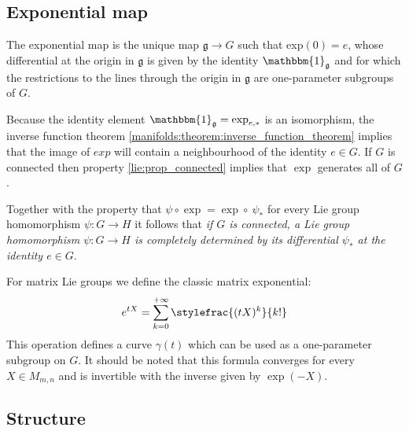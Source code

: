 \subsection{Exponential map}
	
	\begin{property}
		The exponential map is the unique map $\mathfrak{g}\rightarrow G$ such that exp$(0) = e$, whose differential at the origin in $\mathfrak{g}$ is given by the identity $\mathbbm{1}_\mathfrak{g}$ and for which the restrictions to the lines through the origin in $\mathfrak{g}$ are one-parameter subgroups of $G$.
	\end{property}
	\begin{result}
		Because the identity element $\mathbbm{1}_\mathfrak{g} = \exp_{e,\ast}$ is an isomorphism, the inverse function theorem \ref{manifolds:theorem:inverse_function_theorem} implies that the image of $exp$ will contain a neighbourhood of the identity $e\in G$. If $G$ is connected then property \ref{lie:prop_connected} implies that $\exp$ generates all of $G$.
		
		Together with the property that $\psi\circ\exp = \exp\circ\ \psi_\ast$ for every Lie group homomorphism $\psi:G\rightarrow H$ it follows that \textit{if $G$ is connected, a Lie group homomorphism $\psi:G\rightarrow H$ is completely determined by its differential $\psi_\ast$ at the identity $e\in G$}.
	\end{result}
	
	\begin{example}
		For matrix Lie groups we define the classic matrix exponential:
		\begin{equation}
			e^{tX} = \sum_{k=0}^{+\infty}\stylefrac{(tX)^k}{k!}
		\end{equation}
		This operation defines a curve $\gamma(t)$ which can be used as a one-parameter subgroup on $G$. It should be noted that this formula converges for every $X\in M_{m,n}$ and is invertible with the inverse given by $\exp(-X)$.
	\end{example}

\subsection{Structure}  
        
